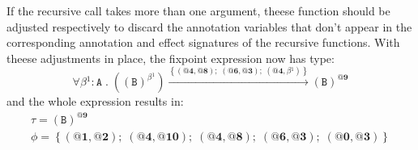 \documentclass[8pt]{extarticle}
\begin{document}
If the recursive call takes more than one argument, theese function should be adjusted respectively to discard the annotation variables that don't appear in the corresponding annotation and effect signatures of the recursive functions. With theese adjustments in place, the fixpoint expression now has type:
\[
\forall{}\beta{}^{1}:\mathtt{A}\;{}.\;{}\left(\left(\mathtt{B}\right)^{\beta{}^{1}}\right)\xrightarrow{\left\{\left(\textbf{@4},\textbf{@8}\right);\;{}\left(\textbf{@6},\textbf{@3}\right);\;{}\left(\textbf{@4},\beta{}^{1}\right)\right\}}\left(\mathtt{B}\right)^{\textbf{@9}}
\]
and the whole expression results in:
\[
\begin{array}{c}
\tau=\left(\mathtt{B}\right)^{\textbf{@9}} \\
\phi=\left\{\left(\textbf{@1},\textbf{@2}\right);\;{}\left(\textbf{@4},\textbf{@10}\right);\;{}\left(\textbf{@4},\textbf{@8}\right);\;{}\left(\textbf{@6},\textbf{@3}\right);\;{}\left(\textbf{@0},\textbf{@3}\right)\right\}
\end{array}
\]
\end{document}
